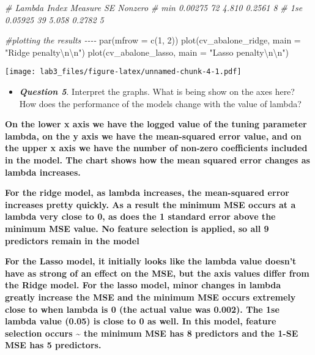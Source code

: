 \documentclass[
]{article}
\newenvironment{Shaded}{\begin{snugshade}}{\end{snugshade}}
\newcommand{\AttributeTok}[1]{\textcolor[rgb]{0.77,0.63,0.00}{#1}}
\newcommand{\CommentTok}[1]{\textcolor[rgb]{0.56,0.35,0.01}{\textit{#1}}}
\newcommand{\DecValTok}[1]{\textcolor[rgb]{0.00,0.00,0.81}{#1}}
\newcommand{\FunctionTok}[1]{\textcolor[rgb]{0.00,0.00,0.00}{#1}}
\newcommand{\NormalTok}[1]{#1}
\newcommand{\SpecialCharTok}[1]{\textcolor[rgb]{0.00,0.00,0.00}{#1}}
\newcommand{\StringTok}[1]{\textcolor[rgb]{0.31,0.60,0.02}{#1}}
\providecommand{\tightlist}{%
  \setlength{\itemsep}{0pt}\setlength{\parskip}{0pt}}
\begin{document}
\begin{Shaded}
\begin{Highlighting}[]
\CommentTok{\#        Lambda   Index   Measure     SE      Nonzero}
\CommentTok{\# min   0.00275    72     4.810     0.2561       8}
\CommentTok{\# 1se   0.05925    39     5.058    0.2782        5}


\CommentTok{\#plotting the results {-}{-}{-}{-}}
\FunctionTok{par}\NormalTok{(}\AttributeTok{mfrow =} \FunctionTok{c}\NormalTok{(}\DecValTok{1}\NormalTok{, }\DecValTok{2}\NormalTok{))}
\FunctionTok{plot}\NormalTok{(cv\_abalone\_ridge, }\AttributeTok{main =} \StringTok{"Ridge penalty}\SpecialCharTok{\textbackslash{}n\textbackslash{}n}\StringTok{"}\NormalTok{)  }
\FunctionTok{plot}\NormalTok{(cv\_abalone\_lasso, }\AttributeTok{main =} \StringTok{"Lasso penalty}\SpecialCharTok{\textbackslash{}n\textbackslash{}n}\StringTok{"}\NormalTok{) }
\end{Highlighting}
\end{Shaded}

\texttt{[image: lab3\_files/figure-latex/unnamed-chunk-4-1.pdf]}

\begin{itemize}
\tightlist
\item
  \textbf{\emph{Question 5}}. Interpret the graphs. What is being show
  on the axes here? How does the performance of the models change with
  the value of lambda?
\end{itemize}

\textbf{On the lower x axis we have the logged value of the tuning
parameter lambda, on the y axis we have the mean-squared error value,
and on the upper x axis we have the number of non-zero coefficients
included in the model. The chart shows how the mean squared error
changes as lambda increases.}

\textbf{For the ridge model, as lambda increases, the mean-squared error
increases pretty quickly. As a result the minimum MSE occurs at a lambda
very close to 0, as does the 1 standard error above the minimum MSE
value. No feature selection is applied, so all 9 predictors remain in
the model}

\textbf{For the Lasso model, it initially looks like the lambda value
doesn't have as strong of an effect on the MSE, but the axis values
differ from the Ridge model. For the lasso model, minor changes in
lambda greatly increase the MSE and the minimum MSE occurs extremely
close to when lambda is 0 (the actual value was 0.002). The 1se lambda
value (0.05) is close to 0 as well. In this model, feature selection
occurs \textasciitilde{} the minimum MSE has 8 predictors and the 1-SE
MSE has 5 predictors.}
\end{document}
